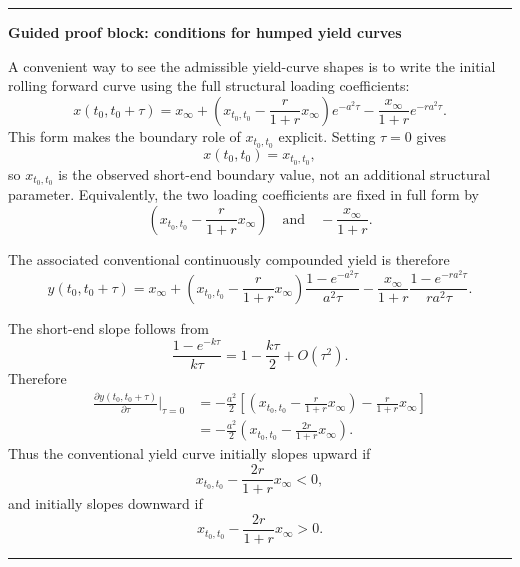 \documentclass[11pt]{article}
\theoremstyle{plainbreak}
\newenvironment{proofblock}[1]{%
    \vspace{0.5em}\hrule\vspace{0.7em}%
    {\bfseries Guided proof block: #1}\par\vspace{0.2em}%
}{%
    \vspace{0.5em}\hrule\vspace{0.7em}%
}
\begin{document}
\begin{proofblock}{conditions for humped yield curves}
A convenient way to see the admissible yield-curve shapes is to write the initial rolling forward curve using the full structural loading coefficients:
\begin{equation*}
    x(t_0,t_0+\tau)
    =x_\infty
    +\left(x_{t_0,t_0}-\frac{r}{1+r}x_\infty\right)e^{-a^2\tau}
    -\frac{x_\infty}{1+r}e^{-ra^2\tau}.
\end{equation*}
This form makes the boundary role of \(x_{t_0,t_0}\) explicit. Setting \(\tau=0\) gives
\begin{equation*}
    x(t_0,t_0)=x_{t_0,t_0},
\end{equation*}
so \(x_{t_0,t_0}\) is the observed short-end boundary value, not an additional structural parameter. Equivalently, the two loading coefficients are fixed in full form by
\begin{equation*}
    \left(x_{t_0,t_0}-\frac{r}{1+r}x_\infty\right)
    \quad\text{and}\quad
    -\frac{x_\infty}{1+r}.
\end{equation*}

The associated conventional continuously compounded yield is therefore
\begin{equation*}
    y(t_0,t_0+\tau)
    =x_\infty
    +\left(x_{t_0,t_0}-\frac{r}{1+r}x_\infty\right)
      \frac{1-e^{-a^2\tau}}{a^2\tau}
    -\frac{x_\infty}{1+r}
      \frac{1-e^{-ra^2\tau}}{ra^2\tau}.
\end{equation*}

The short-end slope follows from
\begin{equation*}
    \frac{1-e^{-k\tau}}{k\tau}=1-\frac{k\tau}{2}+O(\tau^2).
\end{equation*}
Therefore
\begin{align*}
    \frac{\partial y(t_0,t_0+\tau)}{\partial \tau}\bigg|_{\tau=0}
    &=-\frac{a^2}{2}\left[
        \left(x_{t_0,t_0}-\frac{r}{1+r}x_\infty\right)
        -\frac{r}{1+r}x_\infty
      \right] \\
    &=-\frac{a^2}{2}\left(
        x_{t_0,t_0}-\frac{2r}{1+r}x_\infty
      \right).
\end{align*}
Thus the conventional yield curve initially slopes upward if
\begin{equation*}
    x_{t_0,t_0}-\frac{2r}{1+r}x_\infty<0,
\end{equation*}
and initially slopes downward if
\begin{equation*}
    x_{t_0,t_0}-\frac{2r}{1+r}x_\infty>0.
\end{equation*}


\end{proofblock}
\end{document}

